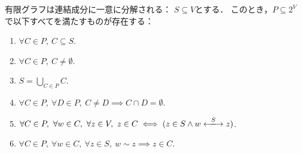 \begin{lemma}
  \label{lem:exists_components}
  \leanok
  有限グラフは連結成分に一意に分解される：
  $S \subseteq V$とする．
  このとき，$P \subseteq 2^V$で以下すべてを満たすものが存在する：
  \begin{enumerate}[label = (\arabic*)]
    \item $\forall C \in P,\ C \subseteq S$.
    \item $\forall C \in P,\ C \ne \emptyset$.
    \item $S = \displaystyle \bigcup_{C \in P} C$.
    \item $\forall C \in P,\ \forall D \in P,\ C \ne D \implies C \cap D = \emptyset$.
    \item $\forall C \in P,\ \forall w \in C,\ \forall z \in V,\ z \in C \iff (z \in S \land w \reach{S} z)$.
    \item $\forall C \in P,\ \forall w \in C,\ \forall z \in S,\ w \sim z \implies z \in C$.
  \end{enumerate}
\end{lemma}

